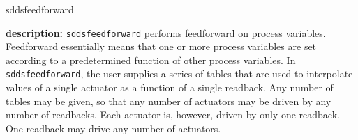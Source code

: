 %
%
\begin{sddsprog}{sddsfeedforward}
\item {\bf description:}
%
%
\verb+sddsfeedforward+ performs feedforward on process variables.
Feedforward essentially means that one or more process variables are
set according to a predetermined function of other process variables.
In \verb+sddsfeedforward+, the user supplies a series of tables that
are used to interpolate values of a single actuator as a function of a
single readback.  Any number of tables may be given, so that any
number of actuators may be driven by any number of readbacks.  Each
actuator is, however, driven by only one readback.  One readback may
drive any number of actuators.


\end{sddsprog}
